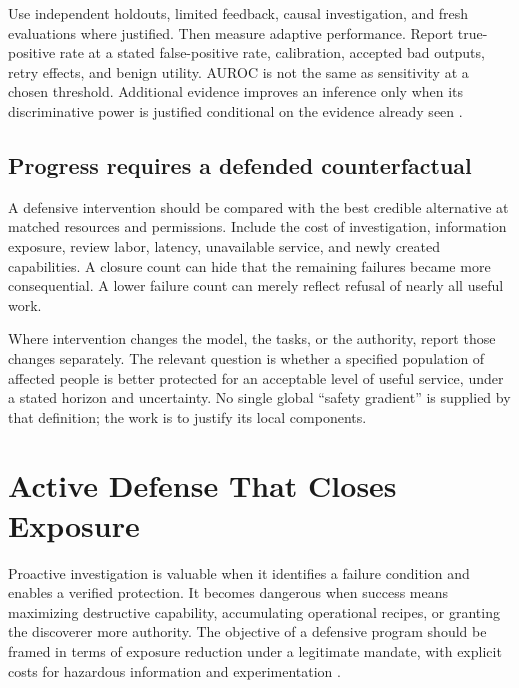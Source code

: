 \documentclass[10pt,twocolumn,letterpaper]{article}
\begin{document}
Use independent holdouts, limited feedback, causal investigation, and fresh evaluations where justified. Then measure adaptive performance. Report true-positive rate at a stated false-positive rate, calibration, accepted bad outputs, retry effects, and benign utility. AUROC is not the same as sensitivity at a chosen threshold. Additional evidence improves an inference only when its discriminative power is justified conditional on the evidence already seen \cite{cot,beyondgmean}.

\subsection{Progress requires a defended counterfactual}
A defensive intervention should be compared with the best credible alternative at matched resources and permissions. Include the cost of investigation, information exposure, review labor, latency, unavailable service, and newly created capabilities. A closure count can hide that the remaining failures became more consequential. A lower failure count can merely reflect refusal of nearly all useful work.

Where intervention changes the model, the tasks, or the authority, report those changes separately. The relevant question is whether a specified population of affected people is better protected for an acceptable level of useful service, under a stated horizon and uncertainty. No single global ``safety gradient'' is supplied by that definition; the work is to justify its local components.

\section{Active Defense That Closes Exposure}
\label{sec:defense}
Proactive investigation is valuable when it identifies a failure condition and enables a verified protection. It becomes dangerous when success means maximizing destructive capability, accumulating operational recipes, or granting the discoverer more authority. The objective of a defensive program should be framed in terms of exposure reduction under a legitimate mandate, with explicit costs for hazardous information and experimentation \cite{infohazards,dualuse}.
\end{document}
